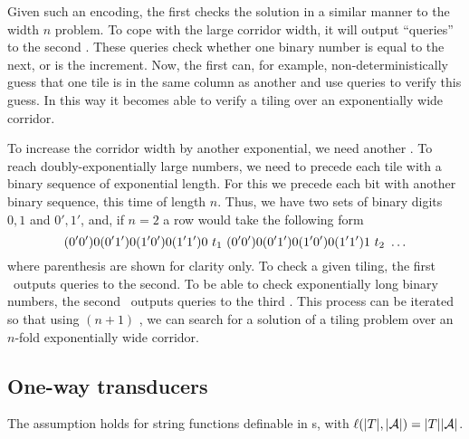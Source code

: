 Given such an encoding, the first \FFT{} checks the solution in a similar manner to the width $n$ problem.
To cope with the large corridor width, it will output ``queries'' to the second \FFT.
These queries check whether one binary number is equal to the next, or is the increment.
Now, the first \FFT{} can, for example, non-deterministically guess that one tile is in the same column as another and use queries to verify this guess.
In this way it becomes able to verify a tiling over an exponentially wide corridor. 

To increase the corridor width by another exponential, we need another \FFT.
To reach doubly-exponentially large numbers, we need to precede each tile with a binary sequence of exponential length.
For this we precede each bit with another binary sequence, this time of length $n$.
Thus, we have two sets of binary digits $0,1$ and $0', 1'$, and, if $n = 2$ a row would take the following form
\[
    (0'0') 0 (0'1') 0 (1'0') 0 (1'1') 0\ \tile_1\ %
    (0'0') 0 (0'1') 0 (1'0') 0 (1'1') 1\ \tile_2\ %
    \ldots 
\]
where parenthesis are shown for clarity only.
To check a given tiling, the first \FFT\ outputs queries to the second.
To be able to check exponentially long binary numbers, the second \FFT\ outputs queries to the third \FFT.
This process can be iterated so that using $(n+1)$ \FFT, we can search for a solution of a tiling problem over an $n$-fold exponentially wide corridor.




\subsection{One-way transducers}


\begin{lemma}\label{lem-1pt}
The \prerec{} assumption holds for string functions definable in \PT{}s, with $\ell(|T|, |\mathcal{A}|) = |T||\mathcal{A}|$.
\end{lemma}

